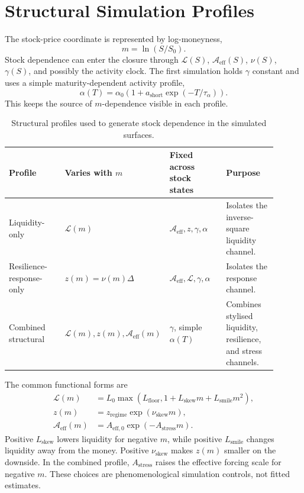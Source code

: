 \documentclass[11pt]{article}
\newcommand{\Aeff}{\mathcal A_{\mathrm{eff}}}
\newcommand{\Liq}{\mathcal L}
\begin{document}
\FloatBarrier

\section{Structural Simulation Profiles}

The stock-price coordinate is represented by log-moneyness,
\begin{equation}
 m=\ln(S/S_0).
\end{equation}
Stock dependence can enter the closure through \(\Liq(S)\), \(\Aeff(S)\),
\(\nu(S)\), \(\gamma(S)\), and possibly the activity clock. The first
simulation holds \(\gamma\) constant and uses a simple maturity-dependent
activity profile,
\begin{equation}
 \alpha(T)
 =
 \alpha_0\left(1+a_{\mathrm{short}}\exp(-T/\tau_\alpha)\right).
 \label{eq:activity-profile}
\end{equation}
This keeps the source of \(m\)-dependence visible in each profile.

\begin{table}[ht]
\centering
\small
\caption{Structural profiles used to generate stock dependence in the simulated surfaces.}
\label{tab:profile-definitions}
\begin{tabular}{p{0.22\linewidth}p{0.26\linewidth}p{0.22\linewidth}p{0.20\linewidth}}
\toprule
Profile & Varies with \(m\) & Fixed across stock states & Purpose \\
\midrule
Liquidity-only & \(\Liq(m)\) &
\(\Aeff,z,\gamma,\alpha\) &
Isolates the inverse-square liquidity channel. \\
Resilience-response-only & \(z(m)=\nu(m)\Delta\) &
\(\Aeff,\Liq,\gamma,\alpha\) &
Isolates the response channel. \\
Combined structural & \(\Liq(m),z(m),\Aeff(m)\) &
\(\gamma\), simple \(\alpha(T)\) &
Combines stylised liquidity, resilience, and stress channels. \\
\bottomrule
\end{tabular}
\end{table}

The common functional forms are
\begin{align}
 \Liq(m)
 &=
 L_0\max\!\left(L_{\mathrm{floor}},
 1+L_{\mathrm{skew}}m+L_{\mathrm{smile}}m^2\right),
 \label{eq:liquidity-profile}\\
 z(m)
 &=
 z_{\mathrm{regime}}\exp(\nu_{\mathrm{skew}}m),
 \label{eq:z-profile}\\
 \Aeff(m)
 &=
 A_{\mathrm{eff},0}\exp(-A_{\mathrm{stress}}m).
 \label{eq:forcing-profile}
\end{align}
Positive \(L_{\mathrm{skew}}\) lowers liquidity for negative \(m\), while
positive \(L_{\mathrm{smile}}\) changes liquidity away from the money.
Positive \(\nu_{\mathrm{skew}}\) makes \(z(m)\) smaller on the downside.
In the combined profile, \(A_{\mathrm{stress}}\) raises the effective forcing
scale for negative \(m\). These choices are phenomenological simulation
controls, not fitted estimates.
\end{document}
